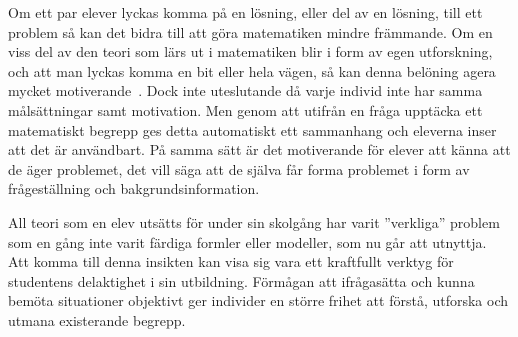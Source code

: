 
\label{sec:delaktighet}
\textcolor{WildStrawberry}{
    Om ett par elever lyckas komma på en lösning, eller del av en lösning, till ett problem så kan det bidra till att göra matematiken mindre främmande. Om en viss del av den teori som lärs ut i matematiken blir i form av egen utforskning, och att man lyckas komma en bit eller hela vägen, så kan denna belöning agera mycket motiverande~\cite{TheElephant}. Dock inte uteslutande då varje individ inte har samma målsättningar samt motivation.} \textcolor{lila}{Men genom att utifrån en fråga upptäcka ett matematiskt begrepp ges detta automatiskt ett sammanhang och eleverna inser att det är användbart. På samma sätt är det motiverande för elever att känna att de äger problemet, det vill säga att de själva får forma problemet i form av frågeställning och bakgrundsinformation.}
    
    \textcolor{WildStrawberry}{
        All teori som en elev utsätts för under sin skolgång har varit ''verkliga'' problem som en gång inte varit färdiga formler eller modeller, som nu går att utnyttja. Att komma till denna insikten kan visa sig vara ett kraftfullt verktyg för studentens delaktighet i sin utbildning. Förmågan att ifrågasätta och kunna bemöta situationer objektivt ger individer en större frihet att förstå, utforska och utmana existerande begrepp.}
        
            